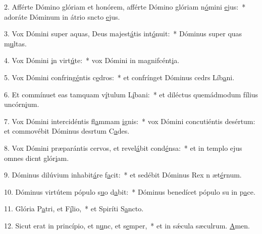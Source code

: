 2. Afférte Dómino glóriam et honórem, afférte Dómino glóriam n\uline{ó}mini \uline{e}jus:~* adoráte Dóminum in átrio sncto \uline{e}jus.\par 
3. Vox Dómini super aquas, Deus majest\uline{á}tis int\uline{ó}nuit:~* Dóminus super quas m\uline{u}ltas.\par 
4. Vox Dómini \uline{i}n virt\uline{ú}te:~* vox Dómini in magnifcént\uline{i}a.\par 
5. Vox Dómini confring\uline{é}ntis c\uline{e}dros:~* et confrínget Dóminus cedrs Líb\uline{a}ni.\par 
6. Et commínuet eas tamquam v\uline{í}tulum L\uline{í}bani:~* et diléctus quemádmodum fílius uncórn\uline{i}um.\par 
7. Vox Dómini intercidéntis fl\uline{a}mmam \uline{i}gnis:~* vox Dómini concutiéntis desértum: et commovébit Dóminus desrtum C\uline{a}des.\par 
8. Vox Dómini præparántis cervos, et revel\uline{á}bit cond\uline{é}nsa:~* et in templo ejus omnes dicnt glór\uline{i}am.\par 
9. Dóminus dilúvium inhabit\uline{á}re f\uline{a}cit:~* et sedébit Dóminus Rex n æt\uline{é}rnum.\par 
10. Dóminus virtútem pópulo s\uline{u}o d\uline{a}bit:~* Dóminus benedícet pópulo su in p\uline{a}ce.\par 
11. Glória P\uline{a}tri, et F\uline{í}lio,~* et Spiríti S\uline{a}ncto.\par 
12. Sicut erat in princípio, et n\uline{u}nc, et s\uline{e}mper,~* et in sǽcula sæculrum. \uline{A}men.\par 
